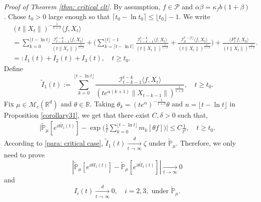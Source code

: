 \documentclass[12pt,a4paper]{amsart}
\theoremstyle{plain}
\theoremstyle{definition}
\numberwithin{equation}{section}
\begin{document}
{\it Proof of Theorem \ref{thm: critical clt}.}\quad
    By assumption, $f\in\mathcal{P}$ and  $\alpha\beta=\kappa_fb(1+\beta)$.
    Chose $t_0 > 0$ large enough so that $\lceil t_0-\ln t_0\rceil \leq \lfloor t_0 \rfloor - 1.$
    We write
\begin{align*}
    &(t\|X_t\|)^{-\frac{1}{1+\beta}}\langle f,X_t\rangle
    \\ &=\sum_{k=0}^{\lfloor t-\ln t \rfloor} \frac{\mathcal I_{t-k-1}^{t-k}\langle f ,X_t\rangle}{(t\|X_t\|)^{\frac{1}{1+\beta}}}+\Big(\sum_{k=\lceil t-\ln t \rceil}^{\lfloor t \rfloor-1} \frac{\mathcal I_{t-k-1}^{t-k}\langle f ,X_t\rangle}{(t\|X_t\|)^{\frac{1}{1+\beta}}}+\frac{\mathcal I_0^{t-\lfloor t \rfloor}\langle f ,X_t\rangle}{(t\|X_t\|)^{\frac{1}{1+\beta}}}\Big) +
    \frac{\langle P^\alpha_tf,X_0\rangle}{(t\|X_t\|)^{\frac{1}{1+\beta}}}.
    \\&=:I_1(t)+I_2(t) + I_3(t),
    \quad t\geq t_0.
\end{align*}
    Define
\[
    \tilde I_1(t)
    :=\sum_{k=0}^{\lfloor t-\ln t \rfloor}\frac{\mathcal I_{t-k-1}^{t-k}\langle f ,X_t\rangle}{(t e^{\alpha(k+1)}\|X_{t-k-1}\|)^{\frac{1}{1+\beta}}},
    \quad t\geq t_0.
\]
    Fix $\mu \in \mathcal M_c(\mathbb R^d)$ and $\theta\in \mathbb R$. Taking $\theta_k=(t e^{\alpha})^{-\frac{1}{1+\beta}} \theta $ and $n={\lfloor t-\ln t \rfloor}$ in Proposition \ref{corollary31},
    we get that there exist $C,\delta>0$ such that,
\begin{align*}
    \Big|\mathbb{\tilde{P}}_{\mu} [e^{i\theta\tilde{I}_1(t)}]-\exp\Big(\frac{1}{t}\sum_{k=0}^{\lfloor t-\ln t \rfloor}m_k[\theta f]\Big)\Big|\leq C \frac{1}{t^{\delta}},
    \quad t\geq t_0.
\end{align*}
    According to \eqref{para: critical case},  $\tilde{I}_1(t)\xrightarrow[t\to \infty]{d}\zeta$ under $\tilde {\mathbb P}_\mu$.
    Therefore, we only need to prove
 \begin{equation}\label{toprove-1}
    |\mathbb{\tilde{P}}_{\mu}[e^{i\theta I_1(t)}]-\mathbb{\tilde{P}}_{\mu}[e^{i\theta\tilde{I}_1(t)}]|
    \xrightarrow[t\to \infty]{} 0
 \end{equation}
    and
\begin{equation}\label{toprove-2}
    I_i(t)\xrightarrow[t\to \infty]{d} 0,
    \quad i = 2,3,  
    \mbox{ under } \tilde {\mathbb P}_\mu.
\end{equation}
\end{document}
